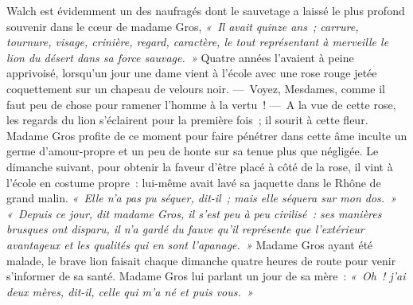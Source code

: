 \documentclass[french,twoside]{book} %
\newcommand\persName[1]{#1}
\newcommand\placeName[1]{#1}
\begin{document}
{\persName Walch} est évidemment un des naufragés dont le sauvetage a laissé le plus profond souvenir dans le cœur de {\persName madame Gros}, \emph{« Il avait quinze ans ; carrure, tournure, visage, crinière, regard, caractère, le tout représentant à merveille le lion du désert dans sa force sauvage. »} Quatre années l’avaient à peine apprivoisé, lorsqu’un jour une dame vient à l’école avec une rose rouge jetée coquettement sur un chapeau de velours noir. — Voyez, Mesdames, comme il faut peu de chose pour ramener l’homme à la vertu ! — A la vue de cette rose, les regards du lion s’éclairent pour la première fois ; il sourit à cette fleur. {\persName Madame Gros} profite de ce moment pour faire pénétrer dans cette âme inculte un germe d’amour-propre et un peu de honte sur sa tenue plus que négligée. Le dimanche suivant, pour obtenir la faveur d’être placé à côté de la rose, il vint à l’école en costume propre : lui-même avait lavé sa jaquette dans le {\placeName Rhône} de grand malin. \emph{« Elle n’a pas pu séquer, dit-il ; mais elle séquera sur mon dos. »} \emph{« Depuis ce jour, dit {\persName madame Gros}, il s’est peu à peu civilisé : ses manières brusques ont disparu, il n’a gardé du fauve qu’il représente que l’extérieur avantageux et les qualités qui en sont l’apanage. »} {\persName Madame Gros} ayant été malade, le brave lion faisait chaque dimanche quatre heures de route pour venir s’informer de sa santé. {\persName Madame Gros} lui parlant un jour de sa mère : \emph{« Oh ! j’ai deux mères, dit-il, celle qui m’a né et puis vous. »}\par
\end{document}
